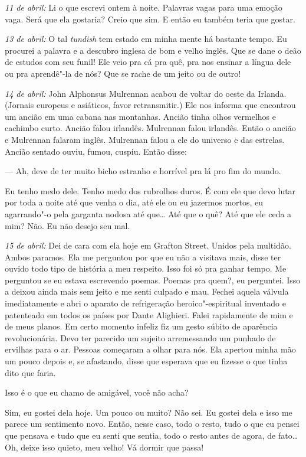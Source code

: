 \medskip\noindent\textit{11 de abril:} Li o que escrevi ontem à noite. Palavras vagas
para uma emoção vaga. Será que ela gostaria? Creio que sim. E então eu
também teria que gostar.

\medskip\noindent\textit{13 de abril:} O tal \textit{tundish} tem estado em minha mente
há bastante tempo. Eu procurei a palavra e a descubro inglesa de bom e
velho inglês. Que se dane o deão de estudos com seu funil! Ele veio
pra cá pra quê, pra nos ensinar a língua dele ou pra aprendê"-la de nós?
Que se rache de um jeito ou de outro!

\medskip\noindent\textit{14 de abril:} John Alphonsus Mulrennan acabou de voltar do oeste
da Irlanda. (Jornais europeus e asiáticos, favor retransmitir.) Ele nos
informa que encontrou um ancião em uma cabana nas montanhas. Ancião
tinha olhos vermelhos e cachimbo curto. Ancião falou irlandês.
Mulrennan falou irlandês. Então o ancião e Mulrennan falaram inglês.
Mulrennan falou a ele do universo e das estrelas. Ancião sentado ouviu,
fumou, cuspiu. Então disse:

 --- Ah, deve de ter muito bicho estranho e horrível pra lá pro fim do mundo.

Eu tenho medo dele. Tenho medo dos rubrolhos duros. É com ele que devo
lutar por toda a noite até que venha o dia, até ele ou eu jazermos
mortos, eu agarrando"-o pela garganta nodosa até que\ldots{} Até que o quê?
Até que ele ceda a mim? Não. Eu não desejo seu mal.

\medskip\noindent\textit{15 de abril:} Dei de cara com ela hoje em Grafton Street. Unidos
pela multidão. Ambos paramos. Ela me perguntou por que eu não a
visitava mais, disse ter ouvido todo tipo de história a meu respeito.
Isso foi só pra ganhar tempo. Me perguntou se eu estava escrevendo
poemas. Poemas pra quem?, eu perguntei. Isso a deixou ainda mais sem
jeito e me senti culpado e mau. Fechei aquela válvula imediatamente e
abri o aparato de refrigeração heroico"-espiritual inventado e
patenteado em todos os países por Dante Alighieri. Falei rapidamente de
mim e de meus planos. Em certo momento infeliz fiz um gesto súbito de
aparência revolucionária. Devo ter parecido um sujeito arremessando um
punhado de ervilhas para o ar. Pessoas começaram a olhar para nós. Ela
apertou minha mão um pouco depois e, se afastando, disse que esperava
que eu fizesse o que tinha dito que faria.

Isso é o que eu chamo de amigável, você não acha?

Sim, eu gostei dela hoje. Um pouco ou muito? Não sei. Eu gostei dela e
isso me parece um sentimento novo. Então, nesse caso, todo o resto,
tudo o que eu pensei que pensava e tudo que eu senti que sentia, todo o
resto antes de agora, de fato\ldots{} Oh, deixe isso quieto, meu velho! Vá
dormir que passa!

